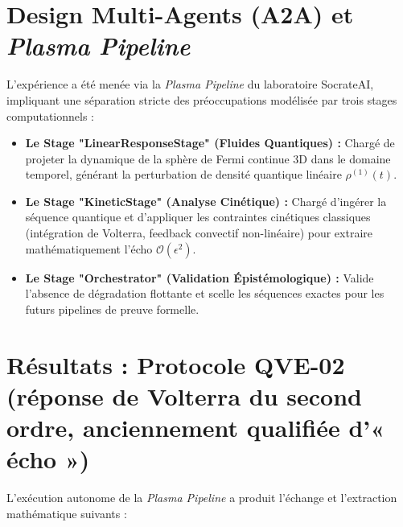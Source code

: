 \documentclass[11pt, a4paper]{article}
\begin{document}
\section{Design Multi-Agents (A2A) et \textit{Plasma Pipeline}}
L'expérience a été menée via la \textit{Plasma Pipeline} du laboratoire SocrateAI, impliquant une séparation stricte des préoccupations modélisée par trois stages computationnels :
\begin{itemize}
    \item \textbf{Le Stage "LinearResponseStage" (Fluides Quantiques) :} Chargé de projeter la dynamique de la sphère de Fermi continue 3D dans le domaine temporel, générant la perturbation de densité quantique linéaire $\rho^{(1)}(t)$.
    \item \textbf{Le Stage "KineticStage" (Analyse Cinétique) :} Chargé d'ingérer la séquence quantique et d'appliquer les contraintes cinétiques classiques (intégration de Volterra, feedback convectif non-linéaire) pour extraire mathématiquement l'écho $\mathcal{O}(\epsilon^2)$.
    \item \textbf{Le Stage "Orchestrator" (Validation Épistémologique) :} Valide l'absence de dégradation flottante et scelle les séquences exactes pour les futurs pipelines de preuve formelle.
\end{itemize}

\section{Résultats : Protocole QVE-02 (réponse de Volterra du second ordre, anciennement qualifiée d'« écho »)}

L'exécution autonome de la \textit{Plasma Pipeline} a produit l'échange et l'extraction mathématique suivants :
\end{document}

